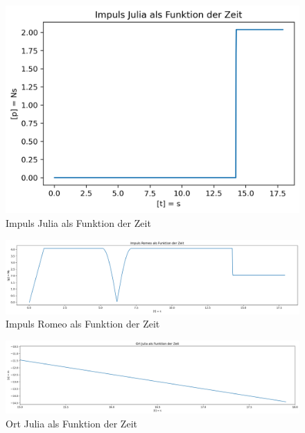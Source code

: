 \documentclass[../main.tex]{subfiles}
\begin{document}
    \begin{figure}[H]
        \begin{center}
            \centerline{\includegraphics[width=155mm]{./images/Inelastisch/ImpulsJulia}}
            \caption{Impuls Julia als Funktion der Zeit}
            \label{fig:ImpulsJulia}
        \end{center}
    \end{figure}

    \begin{figure}[H]
        \begin{center}
            \centerline{\includegraphics[width=155mm]{./images/Inelastisch/ImpulsRomeo}}
            \caption{Impuls Romeo als Funktion der Zeit}
            \label{fig:ImpulsRomeo}
        \end{center}
    \end{figure}

    \begin{figure}[H]
        \begin{center}
            \centerline{\includegraphics[width=155mm]{./images/Inelastisch/OrtJuliaAlsFunktionDerZeit}}
            \caption{Ort Julia als Funktion der Zeit}
            \label{fig:OrtJuliaAlsFunktionDerZeit}
        \end{center}
    \end{figure}
\end{document}
